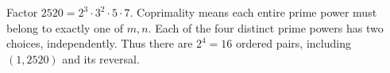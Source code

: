 Factor $2520=2^3\cdot3^2\cdot5\cdot7$. Coprimality means each entire prime power must belong to exactly one of $m,n$. Each of the four distinct prime powers has two choices, independently. Thus there are $\boxed{2^4=16}$ ordered pairs, including $(1,2520)$ and its reversal.
